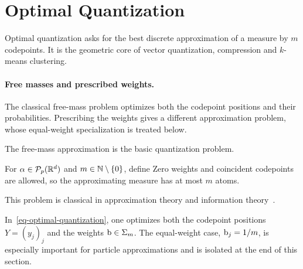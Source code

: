\section{Optimal Quantization}
\label{sec-optimal-quantization}

Optimal quantization asks for the best discrete approximation of a measure by $m$ codepoints. It is the geometric core of vector quantization, compression and $k$-means clustering.

\paragraph{Free masses and prescribed weights.}
The classical free-mass problem optimizes both the codepoint positions and their probabilities. Prescribing the weights gives a different approximation problem, whose equal-weight specialization is treated below.

The free-mass approximation is the basic quantization problem.
\begin{defn}\label{def-optimal-quantization}
For $\alpha\in\mathcal{P}_p(\mathbb{R}^d)$ and $m\in\mathbb{N}\setminus\{0\}$, define
Zero weights and coincident codepoints are allowed, so the approximating measure has at most $m$ atoms.
\end{defn}
This problem is classical in approximation theory and information theory~\cite{graf2000foundationsquantization,Lloyd82}.

In~\eqref{eq-optimal-quantization}, one optimizes both the codepoint positions $Y=(y_j)_j$ and the weights $\mathrm{b}\in\Sigma_m$. The equal-weight case, $\mathrm{b}_j=1/m$, is especially important for particle approximations and is isolated at the end of this section.

